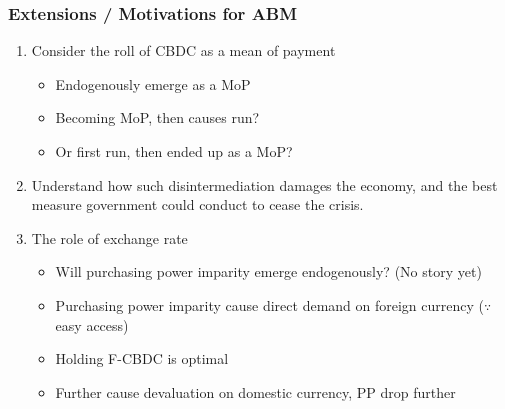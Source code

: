 \begin{frame}
    \frametitle{Extensions / Motivations for ABM}

    \begin{enumerate}[<+->]
        \item Consider the roll of CBDC as a mean of payment
        \begin{itemize}[<.->]
            \item Endogenously emerge as a MoP
            \item Becoming MoP, then causes run? 
            \item Or first run, then ended up as a MoP? 
        \end{itemize}
        \item Understand how such disintermediation damages the economy, 
        and the best measure government could conduct to cease the crisis.
        \item The role of exchange rate
        \begin{itemize}[<.->]
            \item Will purchasing power imparity emerge endogenously? (No story yet)
            \item Purchasing power imparity cause direct demand on foreign currency ($\because$ easy access)
            \item Holding F-CBDC is optimal
            \item Further cause devaluation on domestic currency, PP drop further
        \end{itemize}
        
    \end{enumerate}

    

\end{frame}